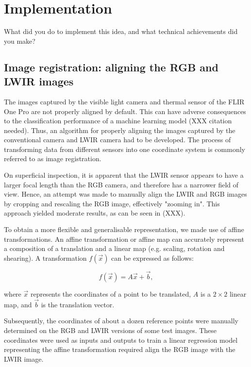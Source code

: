 \documentclass{l4proj}
\begin{document}
\chapter{Implementation}
What did you do to implement this idea, and what technical achievements did you make?

\section{Image registration: aligning the RGB and LWIR images}
\label{image_registration}

The images captured by the visible light camera and thermal sensor of the FLIR One Pro are not properly aligned by default. This can have adverse consequences to the classification performance of a machine learning model (XXX citation needed). Thus, an algorithm for properly aligning the images captured by the conventional camera and LWIR camera had to be developed. The process of transforming data from different sensors into one coordinate system is commonly referred to as image registration.

On superficial inspection, it is apparent that the LWIR sensor appears to have a larger focal length than the RGB camera, and therefore has a narrower field of view. Hence, an attempt was made to manually align the LWIR and RGB images by cropping and rescaling the RGB image, effectively "zooming in". This approach yielded moderate results, as can be seen in (XXX).

To obtain a more flexible and generalisable representation, we made use of affine transformations. An affine transformation or affine map can accurately represent a composition of a translation and a linear map (e.g. scaling, rotation and shearing). A transformation $f(\vec{x})$ can be expressed as follows:

\begin{equation}
  f(\vec{x}) = A \vec{x} + \vec{b},
\end{equation}

where $\vec{x}$ represents the coordinates of a point to be translated, $A$ is a $2 \times 2$ linear map, and $\vec{b}$ is the translation vector.

Subsequently, the coordinates of about a dozen reference points were manually determined on the RGB and LWIR versions of some test images. These coordinates were used as inputs and outputs to train a linear regression model representing the affine transformation required align the RGB image with the LWIR image. 
\end{document}
